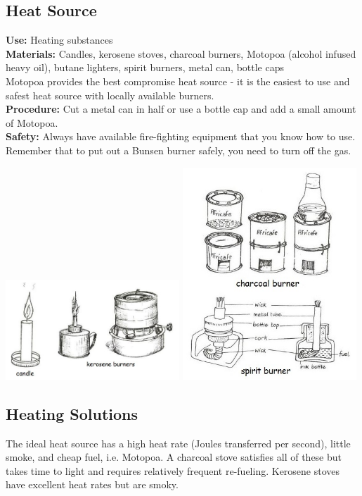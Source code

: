 \begin{multicols}{2}
\section{Heat Source}
\label{sec:heatsources}
\vspace{-10pt}
\textbf{Use:} Heating substances\\
\textbf{Materials:} Candles, kerosene stoves, charcoal burners, Motopoa (alcohol infused heavy oil), butane lighters, spirit burners, metal can, bottle caps \\
Motopoa provides the best compromise heat source - it is the easiest to use and safest heat source with locally available burners.\\
\textbf{Procedure:} Cut a metal can in half or use a bottle cap and add a small amount of Motopoa.\\
\textbf{Safety:} Always have available fire-fighting equipment that you know how to use. Remember that to put out a Bunsen burner safely, you need to turn off the gas.
\begin{center}
\includegraphics[width=0.49\textwidth]{./img/source/heat-sources.jpg}
\includegraphics[width=0.49\textwidth]{./img/source/heat-sources-2.jpg}
\end{center}

\subsection{Heating Solutions}
The ideal heat source has a high heat rate (Joules transferred per second), 
little smoke, 
and cheap fuel, i.e. Motopoa.
A charcoal stove satisfies all of these 
but takes time to light and requires relatively frequent re-fueling. 
Kerosene stoves have excellent heat rates but are smoky. 


\end{multicols}
